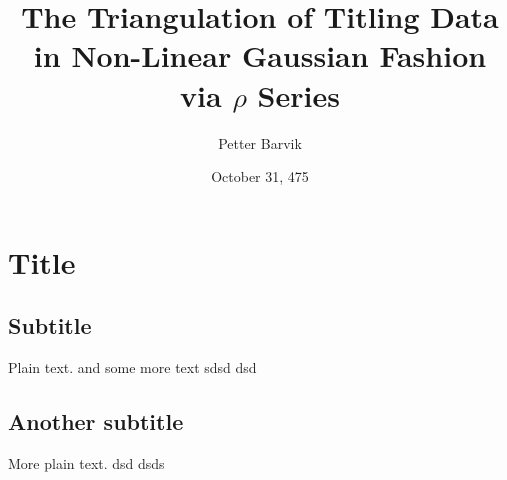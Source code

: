 \documentclass[pdftex,11pt,a4paper]{article}
\begin{document}
\title{The Triangulation of Titling Data in
       Non-Linear Gaussian Fashion via $\rho$ Series}
\date{October 31, 475}
\author{Petter Barvik}

\maketitle
{}
\section{Title}

\subsection{Subtitle}

Plain text. and some more text \cite{Taentzer2004}
sdsd  dsd

\subsection{Another subtitle}

More plain text.
dsd dsds 


 

\end{document}

